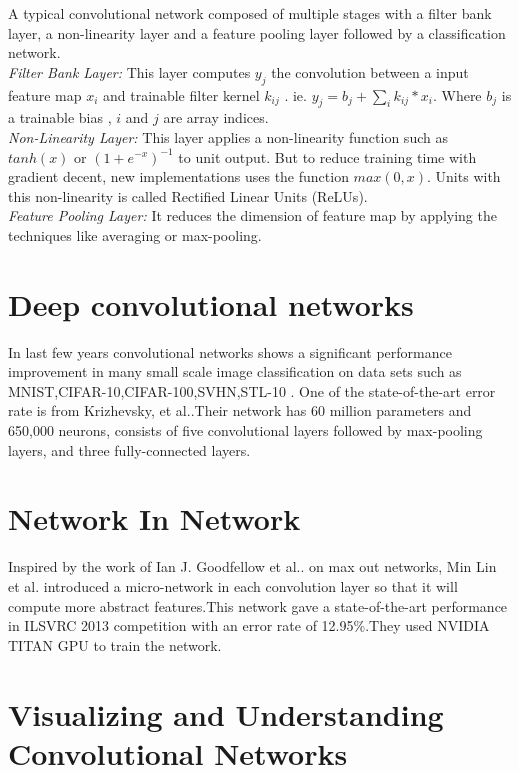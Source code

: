 \documentclass{article}
\begin{document}
\par
A typical convolutional  network composed of multiple stages with a filter bank layer, a non-linearity layer and a feature pooling layer \cite{lecun2010convolutional} followed by a classification network.\\
\emph{Filter Bank Layer:} This layer computes $y_{j}$ the convolution between a input feature map   $x_i$ and trainable filter kernel $k_{ij}$ 
. ie. $y_j=b_j+\sum_i {k_{ij}*x_i}$. Where $b_j$ is a trainable bias , $i$ and $j$ are  array indices.\\
\emph{Non-Linearity Layer:} This layer applies a non-linearity function such as $tanh(x)$ or $(1+e^{-x})^{-1}$ to unit output. But to reduce training time with gradient decent, new implementations uses the function $max(0,x)$. Units with this non-linearity is called Rectified Linear Units (ReLUs)\cite{Nair2010}.\\
\emph{Feature Pooling Layer:} It  reduces the dimension of  feature map by applying the techniques like averaging or max-pooling.

\section {Deep convolutional networks}
In last few years convolutional networks shows a significant performance improvement in many small scale image classification on data sets  such as MNIST\cite{Ciresan:2012g},CIFAR-10,CIFAR-100,SVHN\cite{lee2014deeply},STL-10 \cite{deepfwd}. One of the state-of-the-art error rate is from Krizhevsky, et al.\cite{Krizhevsky2012a}.Their network has 60 million parameters and 650,000 neurons, consists of five convolutional layers followed by max-pooling layers, and three fully-connected layers.






\section{Network In Network }
Inspired by the work of Ian J. Goodfellow et al..\cite{Goodfellow2013} on max out networks,  Min Lin et al. \cite{Lin2013} introduced a micro-network in each convolution layer so that it will compute more abstract features.This network gave a state-of-the-art performance in  ILSVRC 2013 competition with an error rate of 12.95\%.They used NVIDIA TITAN GPU to train the network.

\section{Visualizing and Understanding Convolutional Networks}
\end{document}
